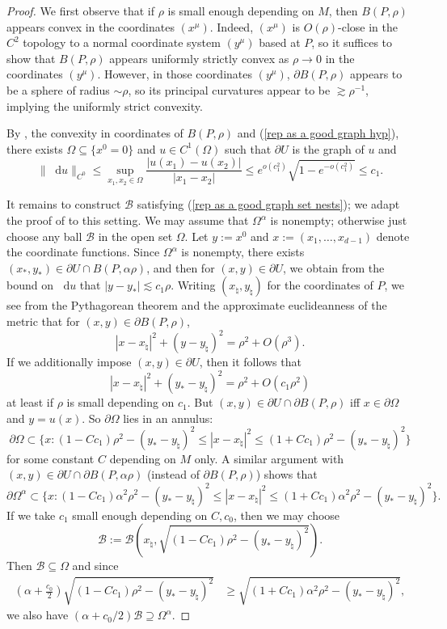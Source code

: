 \documentclass[reqno,11pt]{amsart}
\newcommand*\dif{\mathop{}\!\mathrm{d}}
\theoremstyle{definition}
\numberwithin{equation}{section}
\begin{document}
\begin{proof}
We first observe that if $\rho$ is small enough depending on $M$, then $B(P, \rho)$ appears convex in the coordinates $(x^\mu)$.
Indeed, $(x^\mu)$ is $O(\rho)$-close in the $C^2$ topology to a normal coordinate system $(y^\mu)$ based at $P$, so it suffices to show that $B(P, \rho)$ appears uniformly strictly convex as $\rho \to 0$ in the coordinates $(y^\mu)$.
However, in those coordinates $(y^\mu)$, $\partial B(P, \rho)$ appears to be a sphere of radius $\sim \rho$, so its principal curvatures appear to be $\gtrsim \rho^{-1}$, implying the uniformly strict convexity.

By \cite[Theorem 4.8]{Giusti77}, the convexity in coordinates of $B(P, \rho)$ and (\ref{rep as a good graph hyp}), there exists $\Omega \subseteq \{x^0 = 0\}$ and $u \in C^1(\Omega)$ such that $\partial U$ is the graph of $u$ and 
$$\|\dif u\|_{C^0} \leq \sup_{x_1, x_2 \in \Omega} \frac{|u(x_1) - u(x_2)|}{|x_1 - x_2|} \leq e^{o(c_1^2)}\sqrt{1 - e^{-o(c_1^2)}} \leq c_1.$$

It remains to construct $\mathscr B$ satisfying (\ref{rep as a good graph set nests}); we adapt the proof of \cite[(6.25)]{Giusti77} to this setting.
We may assume that $\Omega^\alpha$ is nonempty; otherwise just choose any ball $\mathscr B$ in the open set $\Omega$.
Let $y := x^0$ and $x := (x_1, \dots, x_{d - 1})$ denote the coordinate functions.
Since $\Omega^\alpha$ is nonempty, there exists $(x_*, y_*) \in \partial U \cap B(P, \alpha \rho)$, and then for $(x, y) \in \partial U$, we obtain from the bound on $\dif u$ that $|y - y_*| \lesssim c_1 \rho$.
Writing $(x_\natural, y_\natural)$ for the coordinates of $P$, we see from the Pythagorean theorem and the approximate euclideanness of the metric that for $(x, y) \in \partial B(P, \rho)$,
$$|x - x_\natural|^2 + (y - y_\natural)^2 = \rho^2 + O(\rho^3).$$
If we additionally impose $(x, y) \in \partial U$, then it follows that 
$$|x - x_\natural|^2 + (y_* - y_\natural)^2 = \rho^2 + O(c_1 \rho^2)$$
at least if $\rho$ is small depending on $c_1$.
But $(x, y) \in \partial U \cap \partial B(P, \rho)$ iff $x \in \partial \Omega$ and $y = u(x)$.
So $\partial \Omega$ lies in an annulus:
$$\partial \Omega \subset \{x: (1 - Cc_1)\rho^2 - (y_* - y_\natural)^2 \leq |x - x_\natural|^2 \leq (1 + Cc_1)\rho^2 - (y_* - y_\natural)^2\}$$
for some constant $C$ depending on $M$ only.
A similar argument with $(x, y) \in \partial U \cap \partial B(P, \alpha \rho)$ (instead of $\partial B(P, \rho)$) shows that
$$\partial \Omega^\alpha \subset \{x: (1 - Cc_1) \alpha^2 \rho^2 - (y_* - y_\natural)^2 \leq |x - x_\natural|^2 \leq (1 + Cc_1)\alpha^2 \rho^2 - (y_* - y_\natural)^2\}.$$
If we take $c_1$ small enough depending on $C, c_0$, then we may choose
$$\mathscr B := \mathscr B\left(x_\natural, \sqrt{(1 - Cc_1)\rho^2 - (y_* - y_\natural)^2}\right).$$
Then $\mathscr B \subseteq \Omega$ and since 
\begin{align*}
\left(\alpha + \frac{c_0}{2}\right) \sqrt{(1 - Cc_1)\rho^2 - (y_* - y_\natural)^2} &\geq \sqrt{(1 + Cc_1)\alpha^2 \rho^2 - (y_* - y_\natural)^2},
\end{align*}
we also have $(\alpha + c_0/2) \mathscr B \supseteq \Omega^\alpha$.
\end{proof}
\end{document}
